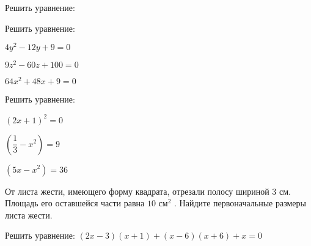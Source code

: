 %
%
\begin{homework}[number=1]
	\begin{listofex}
		\item Решить уравнение:
		\begin{enumcols}[itemcolumns=3]
			\item {}
			\item {}
			\item {}
			\item {}
			\item {}
			\item {}
		\end{enumcols}
		\item {}
		\item Решить уравнение:
			\begin{enumcols}[itemcolumns=3]
			\item \( 4y^2-12y+9=0 \)
			\item \( 9z^2-60z+100=0 \)
			\item \( 64x^2+48x+9=0 \)
		\end{enumcols}
		\item Решить уравнение:
			\begin{enumcols}[itemcolumns=3]
			\item \( (2x+1)^2=0 \)
			\item \( \left( \dfrac{1}{3}-x^2 \right)=9 \)
			\item \( (5x-x^2)=36 \)
		\end{enumcols}
	 \item От листа жести, имеющего форму квадрата, отрезали полосу шириной \( 3 \) см. Площадь его оставшейся части равна \( 10 \) см\( ^2 \) . Найдите первоначальные размеры листа жести.
	 \item Решить уравнение: \( (2x-3)(x+1)+(x-6)(x+6)+x=0 \)
	\end{listofex}
\end{homework}
%
%
%
